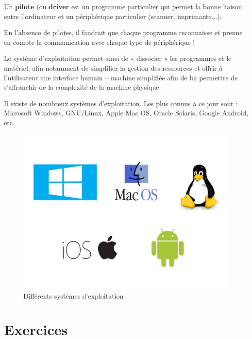 \documentclass[11pt, a4paper]{book}
\begin{document}
	\begin{defi}
		Un {\bf pilote} (ou {\bf driver} est un programme particulier qui permet la bonne liaison entre l'ordinateur et un périphérique particulier (scanner, imprimante...).
	
	\end{defi}
	
	En l’absence de pilotes, il faudrait que chaque programme reconnaisse et prenne en compte la communication avec chaque type de périphérique !
	
	Le système d’exploitation permet ainsi de « dissocier » les programmes et le matériel, afin
notamment de simplifier la gestion des ressources et offrir à l’utilisateur une interface humain – machine simplifiée afin de lui permettre de s’affranchir de la complexité de la machine physique.	
	
	
	Il existe de nombreux systèmes d’exploitation. Les plus connus à ce jour sont : Microsoft Windows, GNU/Linux, Apple Mac OS, Oracle Solaris, Google Android, etc.

\begin{figure}[h]
	\centering
	\includegraphics[scale=.3]{images/OS}
	\caption{Différents systèmes d'exploitation}
\end{figure}


\newpage

\section{Exercices}
\end{document}
